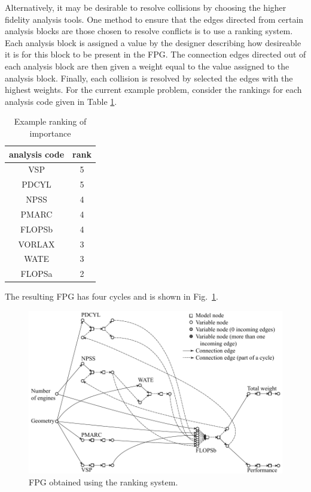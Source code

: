 	Alternatively, it may be desirable to resolve collisions by choosing the higher fidelity analysis tools.
	One method to ensure that the edges directed from certain analysis blocks are those chosen to resolve conflicts is to use a ranking system. Each analysis block is assigned a value by the designer describing how desireable it is for this block to be present in the FPG. The connection edges directed out of each analysis block are then given a weight equal to the value assigned to the analysis block. Finally, each collision is resolved by selected the edges with the highest weights.
For the current example problem, consider the rankings for each analysis code given in Table \ref{t:rankings}.
	\begin{table}[htbp]
	  \centering
	  \caption{Example ranking of importance}
		\begin{tabular}{cc}
		\toprule
		analysis code & rank \\
		\midrule
		VSP   & 5 \\
		PDCYL & 5 \\
		NPSS  & 4 \\
		PMARC & 4 \\
		FLOPSb & 4 \\
		VORLAX & 3 \\
		WATE  & 3 \\
		FLOPSa & 2 \\
		\bottomrule
		\end{tabular}%
	  \label{t:rankings}%
	\end{table}%
	The resulting FPG has four cycles and is shown in Fig.~\ref{f:FPG highest rank}. 
	\begin{figure}[htb!]
	  \begin{center}
		\includegraphics[width=6in]{images/FPG_edit_ranking}
	  \end{center}
	  \caption{FPG obtained using the ranking system.}
	\label{f:FPG highest rank}
	\end{figure}
